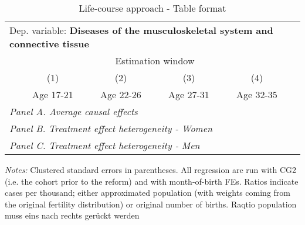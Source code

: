  \begin{table}[H] \centering \begin{threeparttable} \caption{Life-course approach - Table format} {\def\sym#1{\ifmmode^{#1}\else\(^{#1}\)\fi} \begin{tabular}{l*{5}{c}} \toprule \multicolumn{5}{l}{Dep. variable: \textbf{Diseases of the musculoskeletal system and connective tissue}} \\ & \multicolumn{4}{c}{Estimation window} \\ \cmidrule(lr){2-5}
            &\multicolumn{1}{c}{(1)}&\multicolumn{1}{c}{(2)}&\multicolumn{1}{c}{(3)}&\multicolumn{1}{c}{(4)}\\
            &\multicolumn{1}{c}{Age 17-21}&\multicolumn{1}{c}{Age 22-26}&\multicolumn{1}{c}{Age 27-31}&\multicolumn{1}{c}{Age 32-35}\\
\midrule
 \multicolumn{5}{l}{\emph{Panel A. Average causal effects}} \\      \midrule\multicolumn{5}{l}{\emph{Panel B. Treatment effect heterogeneity - Women}} \\      \midrule\multicolumn{5}{l}{\emph{Panel C. Treatment effect heterogeneity - Men}} \\      
\bottomrule \end{tabular} } \begin{tablenotes} \item \scriptsize \emph{Notes:} Clustered standard errors in parentheses. All regression are run with CG2 (i.e. the cohort prior to the reform) and with month-of-birth FEs. Ratios indicate cases per thousand; either approximated population (with weights coming from the original fertility distribution) or original number of births. Raqtio population muss eins nach rechts gerückt werden \end{tablenotes} \end{threeparttable} \end{table} 

